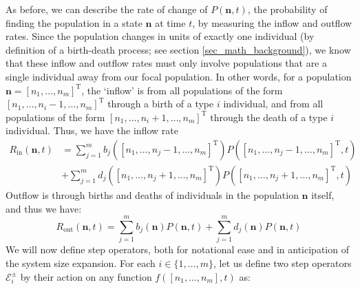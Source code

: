 
As before, we can describe the rate of change of $P(\mathbf{n},t)$, the probability of finding the population in a state $\mathbf{n}$ at time $t$, by measuring the inflow and outflow rates. Since the population changes in units of exactly one individual (by definition of a birth-death process; see section \ref{sec_math_background}), we know that these inflow and outflow rates must only involve populations that are a single individual away from our focal population. In other words, for a population $\mathbf{n} = [n_1,\ldots,n_{m}]^{\mathrm{T}}$, the `inflow' is from all populations of the form $[n_1,\ldots,n_{i}-1,\dots,n_{m}]^{\mathrm{T}}$ through a birth of a type $i$ individual, and from all populations of the form $[n_1,\ldots,n_{i}+1,\dots,n_{m}]^{\mathrm{T}}$ through the death of a type $i$ individual. Thus, we have the inflow rate
\begin{equation}
\label{nD_rate_in}
\begin{split}
R_{\textrm{in}}(\mathbf{n},t) &= \sum\limits_{j=1}^{m}b_{j}([n_1,\ldots,n_{j}-1,\ldots,n_m]^{\mathrm{T}})P([n_1,\ldots,n_{j}-1,\ldots,n_m]^{\mathrm{T}},t) \\
& +\sum\limits_{j=1}^{m}d_{j}([n_1,\ldots,n_{j}+1,\ldots,n_m]^{\mathrm{T}})P([n_1,\ldots,n_{j}+1,\ldots,n_m]^{\mathrm{T}},t)
\end{split}
\end{equation}
Outflow is through births and deaths of individuals in the population $\mathbf{n}$ itself, and thus we have:
\begin{equation}
\label{nD_rate_out}
R_{\textrm{out}}(\mathbf{n},t) = \sum\limits_{j=1}^{m}b_{j}(\mathbf{n})P(\mathbf{n},t) + \sum\limits_{j=1}^{m}d_{j}(\mathbf{n})P(\mathbf{n},t)
\end{equation}
We will now define step operators, both for notational ease and in anticipation of the system size expansion. For each $i \in \{1,\ldots,m\}$, let us define two step operators $\mathcal{E}_{i}^{\pm}$ by their action on any function $f([n_1,\ldots,n_m],t)$ as:
